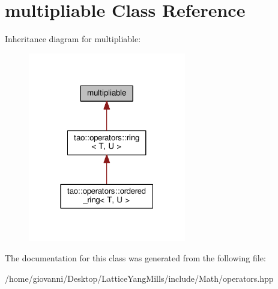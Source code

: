 \hypertarget{classmultipliable}{}\section{multipliable Class Reference}
\label{classmultipliable}


Inheritance diagram for multipliable\+:\nopagebreak
\begin{figure}[H]
\begin{center}
\leavevmode
\includegraphics[width=195pt]{classmultipliable__inherit__graph}
\end{center}
\end{figure}


The documentation for this class was generated from the following file\+:\begin{DoxyCompactItemize}
\item 
/home/giovanni/\+Desktop/\+Lattice\+Yang\+Mills/include/\+Math/operators.\+hpp\end{DoxyCompactItemize}
